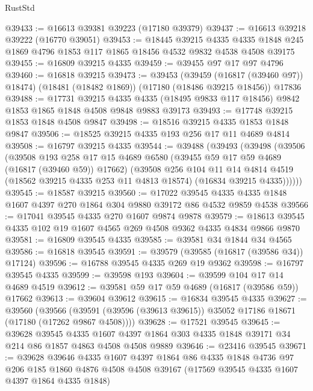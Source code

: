 \begin{lexlean}{RustStd}
\begin{coremodule}
@39433 := @16613 @39381 @39223 (@17180 @39379)
@39437 := @16613 @39218 @39222 (@16770 @39051)
@39453 := @18445
    @39215
    @4335
    @4335
    @1848
    @245
    @1869
    @4796
    @1853
    @117
    @1865
    @18456
    @4532
    @9832
    @4538
    @4508
    @39175
@39455 := @16809 @39215 @4335
@39459 := @39455 @97 @17 @97 @4796
@39460 := @16818 @39215
@39473 := @39453
    (@39459 (@16817 (@39460 @97)) @18474)
    (@18481 (@18482 @1869))
    (@17180 (@18486 @39215 @18456))
    @17836
@39488 := @17731
    @39215
    @4335
    @4335
    (@18495 @9833 @117 @18456)
    @9842
    @1853
    @1865
    @1848
    @4508
    @9848
    @9883
    @39173
@39493 := @17748 @39215 @1853 @1848 @4508 @9847
@39498 := @18516 @39215 @4335 @1853 @1848 @9847
@39506 := @18525 @39215 @4335 @193 @256 @17 @11 @4689 @4814
@39508 := @16797 @39215 @4335
@39544 := @39488
    (@39493
      (@39498
        (@39506
          (@39508
            @193
            @258
            @17
            @15
            @4689
            @6580
            (@39455 @59 @17 @59 @4689 (@16817 (@39460 @59)) @17662)
            (@39508
              @256
              @104
              @11
              @14
              @4814
              @4519
              (@18562 @39215 @4335 @253 @11 @4813 @18574)
              (@16834 @39215 @4335))))))
@39545 := @18587 @39215
@39560 := @17022
    @39545
    @4335
    @4335
    @1848
    @1607
    @4397
    @270
    @1864
    @304
    @9880
    @39172
    @86
    @4532
    @9859
    @4538
@39566 := @17041 @39545 @4335 @270 @1607 @9874 @9878
@39579 := @18613 @39545 @4335 @102 @19 @1607 @4565 @269 @4508 @9362 @4335 @4834 @9866 @9870
@39581 := @16809 @39545 @4335
@39585 := @39581 @34 @1844 @34 @4565
@39586 := @16818 @39545
@39591 := @39579 (@39585 (@16817 (@39586 @34)) @17124)
@39596 := @16788 @39545 @4335 @269 @19 @9362
@39598 := @16797 @39545 @4335
@39599 := @39598 @193
@39604 := @39599 @104 @17 @14 @4689 @4519
@39612 := @39581 @59 @17 @59 @4689 (@16817 (@39586 @59)) @17662
@39613 := @39604 @39612
@39615 := @16834 @39545 @4335
@39627 := @39560
    (@39566 (@39591 (@39596 (@39613 @39615)) @35052 @17186 @18671 (@17180 (@17262 @9867 @4508))))
@39628 := @17521 @39545
@39645 := @39628
    @39545
    @4335
    @1607
    @4397
    @1864
    @303
    @4335
    @1848
    @39171
    @34
    @214
    @86
    @1857
    @4863
    @4508
    @4508
    @9889
@39646 := @23416 @39545
@39671 := @39628
    @39646
    @4335
    @1607
    @4397
    @1864
    @86
    @4335
    @1848
    @4736
    @97
    @206
    @185
    @1860
    @4876
    @4508
    @4508
    @39167
    (@17569 @39545 @4335 @1607 @4397 @1864 @4335 @1848)

\end{coremodule}
\end{lexlean}

